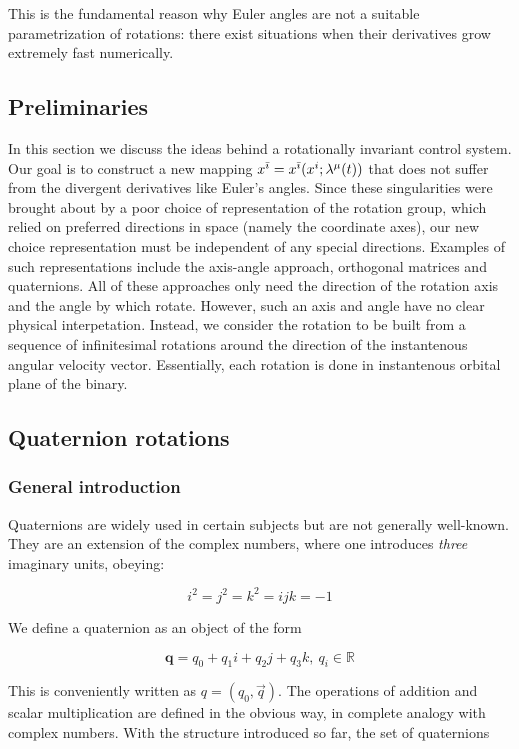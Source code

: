 \documentclass[aps, prd, amsmath, floats, floatfix, twocolumn,superscriptaddress, nofootinbib, showpacs]{revtex4-1}
\theoremstyle{plain}
\theoremstyle{definition}
\newcommand{\w}[1]{\mathbf{#1}}
\begin{document}
This is the fundamental reason why Euler angles are not a suitable 
parametrization of rotations: there exist situations when their derivatives 
grow extremely fast numerically.
\subsection{Preliminaries}
In this section we discuss the ideas behind a rotationally invariant control 
system. Our goal is to construct a new mapping  $x^{\bar\imath}=x^{\bar \imath}\large(x^i; \lambda^\mu(t)\large)$ that does not suffer from the divergent derivatives like Euler's angles. Since these singularities were brought about by a poor choice of representation of the rotation group, which relied on preferred directions in space (namely the coordinate axes), our new choice representation must be independent of any special directions. Examples of such representations include the axis-angle approach, orthogonal matrices and quaternions. All of these approaches only need the direction of the rotation axis and the angle by which rotate. However, such an axis and angle have no clear physical interpetation. Instead, we consider the rotation to be built from a sequence of infinitesimal rotations around the direction of the instantenous angular velocity vector. Essentially, each rotation is done in instantenous orbital plane of the binary. 

\subsection{Quaternion rotations}


\subsubsection*{General introduction}
Quaternions are widely used in certain subjects but are not generally 
well-known. They are an extension of the complex numbers,
where one introduces \emph{three} imaginary units, obeying:

\[ i^{2}=j^{2}=k^{2}=ijk=-1 \]

 We define a quaternion as an object of the form

\[ \w{q}=q_{0}+q_{1}i+q_{2}j+q_{3}k,\ q_{i} \in \mathbb{R} \]

This is conveniently written as $ q = (q_{0},\vec{q}) $. The operations of
addition and scalar multiplication are defined in the obvious way, in complete
analogy with complex numbers. With the structure introduced so far, the set 
of quaternions
\end{document}
